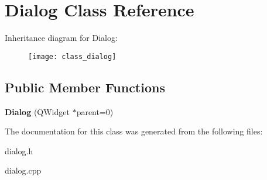 \hypertarget{class_dialog}{}\section{Dialog Class Reference}
\label{class_dialog}
Inheritance diagram for Dialog\+:\begin{figure}[H]
\begin{center}
\leavevmode
\texttt{[image: class\_dialog]}
\end{center}
\end{figure}
\subsection*{Public Member Functions}
\begin{DoxyCompactItemize}
\item 
\mbox{\label{class_dialog_acfa2063f9f962d394c6a645b6e7e08d8}} 
{\bfseries Dialog} (Q\+Widget $\ast$parent=0)
\end{DoxyCompactItemize}


The documentation for this class was generated from the following files\+:\begin{DoxyCompactItemize}
\item 
dialog.\+h\item 
dialog.\+cpp\end{DoxyCompactItemize}

